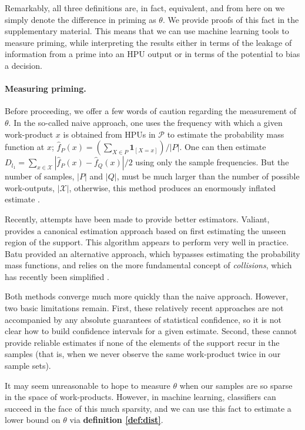\documentclass[12pt]{article}
\begin{document}
Remarkably, all three definitions are, in fact, equivalent, and from here on
we simply denote the difference in priming as $\theta$.  We provide proofs
of this fact in the supplementary material.  This means that we
can use machine learning tools to measure priming, while interpreting the
results either in terms of the  leakage of information from a prime into an 
HPU output or in terms of the potential to bias a decision.

\paragraph{Measuring priming.}
Before proceeding, we offer a few words of caution regarding the measurement 
of $\theta$.  In the so-called naive approach, one uses the frequency 
with which a given work-product $x$ is obtained from HPUs in $\mathcal{P}$ to 
estimate the probability mass function at $x$; 
$\hat{f}_P(x) = (\sum_{X\in P} \mathbf{1}_{[X=x]})/|P|$.
One can then estimate 
$
D_{l_1} = 
	\sum_{x \in \mathcal{X}} \left|\hat{f}_P(x) - \hat{f}_Q(x) \right|/2
$ 
using only the sample frequencies. But the number of samples, $|P|$ and 
$|Q|$, must be much larger than the number of possible work-outputs, 
$|\mathcal{X}|$, otherwise, this method produces an enormously inflated 
estimate \cite{val-thesis}.

Recently, attempts have been made to provide better estimators. Valiant, 
provides a canonical estimation approach based on first estimating the unseen 
region of the support\cite{val-thesis}. This algorithm appears to perform 
very well in practice.  Batu provided an alternative approach, which bypasses 
estimating the probability mass functions, and relies on the more fundamental 
concept of \textit{collisions}\cite{batu2000testing,batu2013testing}, which 
has recently been simplified \cite{chan2014optimal}.

Both methods converge much more quickly than the naive approach. However, two 
basic limitations remain. First, these relatively recent approaches are not 
accompanied by any absolute guarantees of statistical confidence, so it is not 
clear how to build confidence intervals for a given estimate. Second, these 
cannot provide reliable estimates if none of the elements of the support 
recur in the samples (that is, when we never observe the same work-product 
twice in our sample sets).

It may seem unreasonable to hope to measure $\theta$ when our samples are so 
sparse in the space of work-products.  However, in machine learning,
classifiers can succeed in the face of this much sparsity, and we can use
this fact to estimate a lower bound on $\theta$ via \textbf{definition \ref{def:dist}}.
\end{document}
